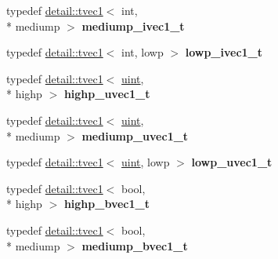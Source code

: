 \begin{DoxyCompactItemize}
\item 
\hypertarget{namespaceglm_a4e6e24e94c7570374fccd106c91e8bb8}{typedef \hyperlink{structglm_1_1detail_1_1tvec1}{detail\-::tvec1}$<$ int, \\*
mediump $>$ {\bfseries mediump\-\_\-ivec1\-\_\-t}}\label{namespaceglm_a4e6e24e94c7570374fccd106c91e8bb8}

\item 
\hypertarget{namespaceglm_a922780199c60272ceb0a56cad13a6c31}{typedef \hyperlink{structglm_1_1detail_1_1tvec1}{detail\-::tvec1}$<$ int, lowp $>$ {\bfseries lowp\-\_\-ivec1\-\_\-t}}\label{namespaceglm_a922780199c60272ceb0a56cad13a6c31}

\item 
\hypertarget{namespaceglm_ab849167b499d58c4ec64b435d9696115}{typedef \hyperlink{structglm_1_1detail_1_1tvec1}{detail\-::tvec1}$<$ \hyperlink{group__core__precision_ga4fd29415871152bfb5abd588334147c8}{uint}, \\*
highp $>$ {\bfseries highp\-\_\-uvec1\-\_\-t}}\label{namespaceglm_ab849167b499d58c4ec64b435d9696115}

\item 
\hypertarget{namespaceglm_a7df2834f455bdd3c3b82ff7cb60f272a}{typedef \hyperlink{structglm_1_1detail_1_1tvec1}{detail\-::tvec1}$<$ \hyperlink{group__core__precision_ga4fd29415871152bfb5abd588334147c8}{uint}, \\*
mediump $>$ {\bfseries mediump\-\_\-uvec1\-\_\-t}}\label{namespaceglm_a7df2834f455bdd3c3b82ff7cb60f272a}

\item 
\hypertarget{namespaceglm_a5b77766992759c6490e538bbf7e7cd79}{typedef \hyperlink{structglm_1_1detail_1_1tvec1}{detail\-::tvec1}$<$ \hyperlink{group__core__precision_ga4fd29415871152bfb5abd588334147c8}{uint}, lowp $>$ {\bfseries lowp\-\_\-uvec1\-\_\-t}}\label{namespaceglm_a5b77766992759c6490e538bbf7e7cd79}

\item 
\hypertarget{namespaceglm_a12dfb09db42f0b29fa85afa1ad2dbd23}{typedef \hyperlink{structglm_1_1detail_1_1tvec1}{detail\-::tvec1}$<$ bool, \\*
highp $>$ {\bfseries highp\-\_\-bvec1\-\_\-t}}\label{namespaceglm_a12dfb09db42f0b29fa85afa1ad2dbd23}

\item 
\hypertarget{namespaceglm_a84283cea80da3ae0e5a01763d5de143b}{typedef \hyperlink{structglm_1_1detail_1_1tvec1}{detail\-::tvec1}$<$ bool, \\*
mediump $>$ {\bfseries mediump\-\_\-bvec1\-\_\-t}}\label{namespaceglm_a84283cea80da3ae0e5a01763d5de143b}


\end{DoxyCompactItemize}
